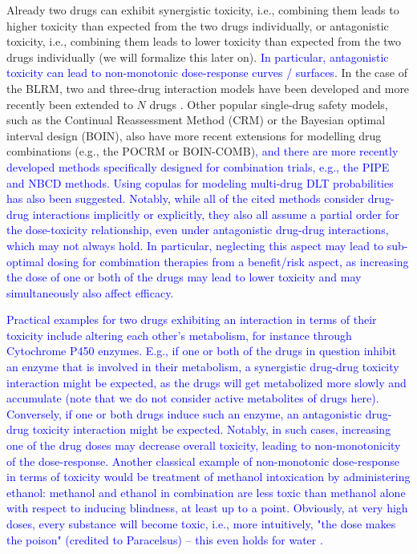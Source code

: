 \documentclass[AMA,STIX1COL]{WileyNJD-v2}
\newcommand{\revision}[1]{\textcolor{blue}{#1}}
\begin{document}
Already two drugs can exhibit synergistic toxicity, i.e., combining them leads to higher toxicity than expected from the two drugs individually, or antagonistic toxicity, i.e., combining them leads to lower toxicity than expected from the two drugs individually (we will formalize this later on). \revision{In particular, antagonistic toxicity can lead to non-monotonic dose-response curves / surfaces}. In the case of the BLRM, two and three-drug interaction models have been developed \cite{Neuenschwander2014} and more recently been extended to $N$ drugs \cite{OncoBayes2}. Other popular single-drug safety models, such as the Continual Reassessment Method (CRM)\cite{Quigley1990} or the Bayesian optimal interval design (BOIN)\cite{Yuan2016}, also have more recent extensions for modelling drug combinations (e.g., the POCRM\cite{Wages2011} or BOIN-COMB\cite{Zhang2016, Lin2017})\revision{, and there are more recently developed methods specifically designed for combination trials, e.g., the PIPE\cite{Mander2015} and NBCD\cite{Razaee2022} methods. Using copulas for modeling multi-drug DLT probabilities has also been suggested\cite{Yin2009}. Notably, while all of the cited methods consider drug-drug interactions implicitly or explicitly, they also all assume a partial order for the dose-toxicity relationship, even under antagonistic drug-drug interactions, which may not always hold. In particular, neglecting this aspect may lead to sub-optimal dosing for combination therapies from a benefit/risk aspect, as increasing the dose of one or both of the drugs may lead to lower toxicity and may simultaneously also affect efficacy.}

\revision{Practical examples for two drugs exhibiting an interaction in terms of their toxicity include altering each other's metabolism, for instance through Cytochrome P450 enzymes\cite{Tanaka1998}. E.g., if one or both of the drugs in question inhibit an enzyme that is involved in their metabolism, a synergistic drug-drug toxicity interaction might be expected, as the drugs will get metabolized more slowly and accumulate (note that we do not consider active metabolites of drugs here). Conversely, if one or both drugs induce such an enzyme, an antagonistic drug-drug toxicity interaction might be expected. Notably, in such cases, increasing one of the drug doses may decrease overall toxicity, leading to non-monotonicity of the dose-response. Another classical example of non-monotonic dose-response in terms of toxicity would be treatment of methanol intoxication by administering ethanol: methanol and ethanol in combination are less toxic than methanol alone with respect to inducing blindness\cite{Marraffa2012}, at least up to a point. Obviously, at very high doses, every substance will become toxic, i.e., more intuitively, "the dose makes the poison" (credited to Paracelsus\cite{Grandjean2016}) -- this even holds for water \cite{ROWNTREE1923, Gardner2002}.}
\end{document}

